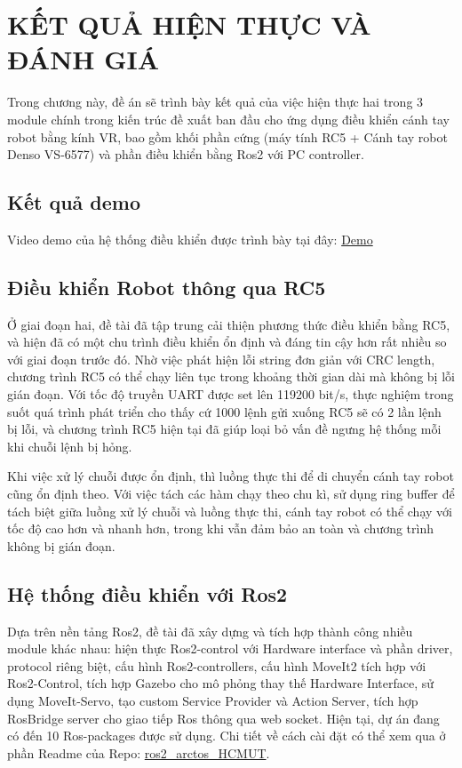 \chapter{KẾT QUẢ HIỆN THỰC VÀ ĐÁNH GIÁ}

Trong chương này, đề án sẽ trình bày kết quả của việc hiện thực hai trong 3 module chính trong kiến trúc đề xuất ban đầu cho ứng dụng điều khiển cánh tay robot bằng kính VR, bao gồm khối phần cứng (máy tính RC5 + Cánh tay robot Denso VS-6577) và phần điều khiển bằng Ros2 với PC controller.

\section{Kết quả demo}

Video demo của hệ thống điều khiển được trình bày tại đây: \href{https://drive.google.com/drive/folders/1OyP-rfXzVsNN-aHCGCSpOcyiajlx_tWP?usp=sharing}{Demo}

\section{Điều khiển Robot thông qua RC5}

Ở giai đoạn hai, đề tài đã tập trung cải thiện phương thức điều khiển bằng RC5, và hiện đã có một chu trình điều khiển ổn định và đáng tin cậy hơn rất nhiều so với giai đoạn trước đó. Nhờ việc phát hiện lỗi string đơn giản với CRC length, chương trình RC5 có thể chạy liên tục trong khoảng thời gian dài mà không bị lỗi gián đoạn. Với tốc độ truyền UART được set lên 119200 bit/s, thực nghiệm trong suốt quá trình phát triển cho thấy cứ 1000 lệnh gửi xuống RC5 sẽ có 2 lần lệnh bị lỗi, và chương trình RC5 hiện tại đã giúp loại bỏ vấn đề ngưng hệ thống mỗi khi chuỗi lệnh bị hỏng.

Khi việc xử lý chuỗi được ổn định, thì luồng thực thi để di chuyển cánh tay robot cũng ổn định theo. Với việc tách các hàm chạy theo chu kì, sử dụng ring buffer để tách biệt giữa luồng xử lý chuỗi và luồng thực thi, cánh tay robot có thể chạy với tốc độ cao hơn và nhanh hơn, trong khi vẫn đảm bảo an toàn và chương trình không bị gián đoạn.

\section{Hệ thống điều khiển với Ros2}

Dựa trên nền tảng Ros2, đề tài đã xây dựng và tích hợp thành công nhiều module khác nhau: hiện thực Ros2-control với Hardware interface và phần driver, protocol riêng biệt, cấu hình Ros2-controllers, cấu hình MoveIt2 tích hợp với Ros2-Control, tích hợp Gazebo cho mô phỏng thay thế Hardware Interface, sử dụng MoveIt-Servo, tạo custom Service Provider và Action Server, tích hợp RosBridge server cho giao tiếp Ros thông qua web socket. Hiện tại, dự án đang có đến 10 Ros-packages được sử dụng. Chi tiết về cách cài đặt có thể xem qua ở phần Readme của Repo: \href{https://github.com/ngoccatt/ros2_arctos_HCMUT/tree/cat_impl}{ros2\_arctos\_HCMUT}.

